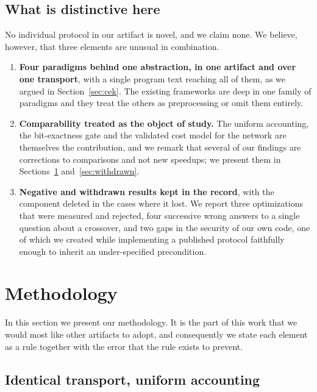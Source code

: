 \documentclass[11pt]{article}
\begin{document}
\subsection{What is distinctive here}
\label{sec:related:delta}

No individual protocol in our artifact is novel, and we claim none. We believe, however,
that three elements are unusual in combination.

\begin{enumerate}
  \item \textbf{Four paradigms behind one abstraction, in one artifact and over one
    transport}, with a single program text reaching all of them, as we argued in
    Section~\ref{sec:cek}. The existing frameworks are deep in one family of paradigms and they
    treat the others as preprocessing or omit them entirely.
  \item \textbf{Comparability treated as the object of study.} The uniform accounting, the
    bit-exactness gate and the validated cost model for the network are themselves the
    contribution, and we remark that several of our findings are corrections to comparisons and not new speedups; we present them in Sections~\ref{sec:method}
    and~\ref{sec:withdrawn}.
  \item \textbf{Negative and withdrawn results kept in the record}, with the component deleted
    in the cases where it lost. We report three optimizations that were measured and rejected,
    four successive wrong answers to a single question about a crossover, and two gaps in the
    security of our own code, one of which we created while implementing a published protocol
    faithfully enough to inherit an under-specified precondition.
\end{enumerate}

\section{Methodology}
\label{sec:method}

In this section we present our methodology. It is the part of this work that we would most
like other artifacts to adopt, and consequently we state each element as a rule together with the
error that the rule exists to prevent.

\subsection{Identical transport, uniform accounting}
\end{document}
